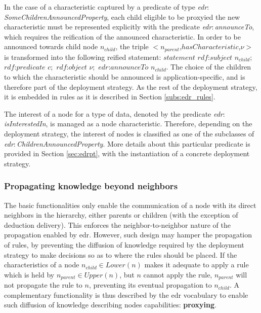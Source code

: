 \documentclass{iosart2c}
\newcommand{\namespace}[1]{\textit{#1$:$}}
\newcommand{\concept}[2]{\namespace{#1}\-\textit{#2}}
\newcommand{\triplet}[3]{$<$#1,\textit{#2},#3$>$}
\begin{document}
In the case of a characteristic captured by a predicate of type \concept{edr}{Some\-Children\-Announced\-Property}, each child eligible to be proxyied the new characteristic must be represented explicitly with the predicate \concept{edr}{announce\-To}, which requires the reification of the announced characteristic.
In order to be announced towards child node $n_{child}$, the triple \triplet{$n_{parent}$}{$hasCharacteristic$}{$\nu$} is transformed into the following reified statement: 
$statement$ $rdf$:$subject$ $n_{child};$ $rdf$:$predicate$ $c;$ $rdf$:$object$ $\nu;$ $edr$:$announceTo$ $n_{child}$. 
The choice of the children to which the characteristic should be announced is application-specific, and is therefore part of the deployment strategy.
As the rest of the deployment strategy, it is embedded in rules as it is described in Section \textsection \ref{subs:edr_rules}.

The interest of a node for a type of data, denoted by the predicate \concept{edr}{is\-Interested\-In}, is managed as a node characteristic.
Therefore, depending on the deployment strategy, the interest of nodes is classified as one of the subclasses of \concept{edr}{Children\-Announced\-Property}.
More details about this particular predicate is provided in Section \textsection \ref{sec:edrpt}, with the instantiation of a concrete deployment strategy.

\subsubsection{Propagating knowledge beyond neighbors}
\label{subsubs:proxying}

The basic functionalities only enable the communication of a node with its direct neighbors in the hierarchy, either parents or children (with the exception of deduction delivery).
This enforces the neighbor-to-neighbor nature of the propagation enabled by \gls{edr}.
However, such design may hamper the propagation of rules, by preventing the diffusion of knowledge required by the deployment strategy to make decisions so as to where the rules should be placed.
If the characteristics of a node $n_{child}\in Lower(n)$ makes it adequate to apply a rule which is held by $n_{parent}\in Upper(n)$, but $n$ cannot apply the rule, $n_{parent}$ will not propagate the rule to $n$, preventing its eventual propagation to $n_{child}$.
A complementary functionality is thus described by the \gls{edr} vocabulary to enable such diffusion of knowledge describing nodes capabilities: \textbf{proxying}.
\end{document}
